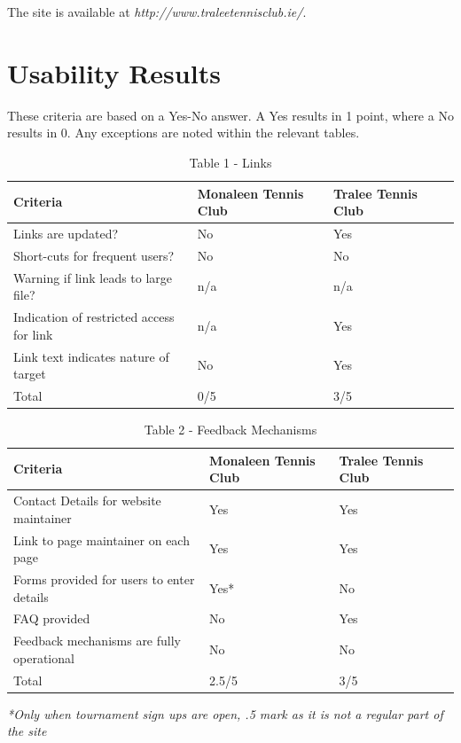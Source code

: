 The site is available at \textit{http://www.traleetennisclub.ie/}.

\section{Usability Results}
\label{sec:usabilty}

These criteria are based on a Yes-No answer. A Yes results in 1 point, where a No results in 0. Any exceptions are noted within the relevant tables.

\begin{table}[H]
\caption{Table 1 - Links}
\begin{center}
    \begin{tabular}{ | l | l | l | p{5cm} |}
    \hline
	\textbf{Criteria} & \textbf{Monaleen Tennis Club} & \textbf{Tralee Tennis Club}\\ \hline
	Links are updated? & No & Yes\\ \hline
	Short-cuts for frequent users? & No & No\\ \hline
	Warning if link leads to large file? & n/a & n/a\\ \hline
	Indication of restricted access for link & n/a & Yes\\ \hline
	Link text indicates nature of target & No & Yes\\ \hline
	Total & 0/5 & 3/5\\ \hline	
    \end{tabular}
\end{center}
\label{fig:table1}
\end{table}

\begin{table}[H]
\caption{Table 2 - Feedback Mechanisms}
\begin{center}
    \begin{tabular}{ | l | l | l | p{5cm} |}
    \hline
	\textbf{Criteria} & \textbf{Monaleen Tennis Club} & \textbf{Tralee Tennis Club}\\ \hline
	Contact Details for website maintainer & Yes & Yes\\ \hline
	Link to page maintainer on each page & Yes & Yes\\ \hline
	Forms provided for users to enter details & Yes* & No\\ \hline
	FAQ provided & No & Yes\\ \hline
	Feedback mechanisms are fully operational & No & No\\ \hline
	Total & 2.5/5 & 3/5\\ \hline	
    \end{tabular}
\end{center}
\label{fig:table2}
\end{table}
\textit{*Only when tournament sign ups are open, .5 mark as it is not a regular part of the site}

